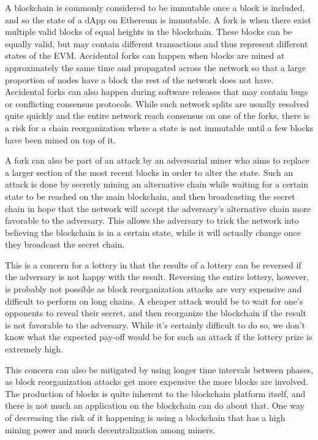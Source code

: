 A blockchain is commonly considered to be immutable once a block is included, and so the state of a dApp on Ethereum is immutable. A fork is when there exist multiple valid blocks of equal heights in the blockchain. These blocks can be equally valid, but may contain different transactions and thus represent different states of the EVM. Accidental forks can happen when blocks are mined at approximately the same time and propagated across the network so that a large proportion of nodes have a block the rest of the network does not have. Accidental forks can also happen during software releases that may contain bugs or conflicting consensus protocols. While such network splits are usually resolved quite quickly and the entire network reach consensus on one of the forks, there is a risk for a chain reorganization where a state is not immutable until a few blocks have been mined on top of it.

A fork can also be part of an attack by an adversarial miner who aims to replace a larger section of the most recent blocks in order to alter the state. Such an attack is done by secretly mining an alternative chain while waiting for a certain state to be reached on the main blockchain, and then broadcasting the secret chain in hope that the network will accept the adversary's alternative chain more favorable to the adversary. This allows the adversary to trick the network into believing the blockchain is in a certain state, while it will actually change once they broadcast the secret chain.

This is a concern for a lottery in that the results of a lottery can be reversed if the adversary is not happy with the result. Reversing the entire lottery, however, is probably not possible as block reorganization attacks are very expensive and difficult to perform on long chains. A cheaper attack would be to wait for one's opponents to reveal their secret, and then reorganize the blockchain if the result is not favorable to the adversary. While it's certainly difficult to do so, we don't know what the expected pay-off would be for such an attack if the lottery prize is extremely high.

This concern can also be mitigated by using longer time intervals between phases, as block reorganization attacks get more expensive the more blocks are involved. The production of blocks is quite inherent to the blockchain platform itself, and there is not much an application on the blockchain can do about that. One way of decreasing the risk of it happening is using a blockchain that has a high mining power and much decentralization among miners.

